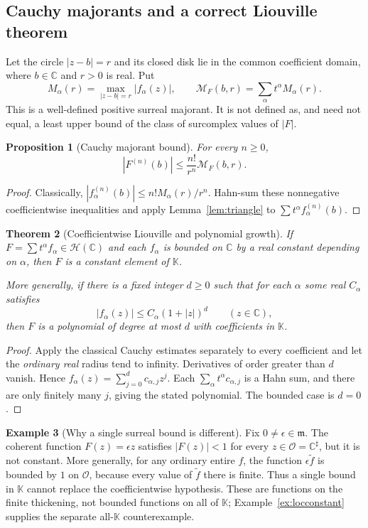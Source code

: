 \documentclass[11pt,a4paper]{article}
\numberwithin{equation}{section}
\newtheorem{theorem}{Theorem}[section]
\newtheorem{proposition}[theorem]{Proposition}
\theoremstyle{definition}
\newtheorem{example}[theorem]{Example}
\theoremstyle{remark}
\newcommand{\K}{\mathbb K}
\newcommand{\C}{\mathbb C}
\newcommand{\OO}{\mathcal O}
\newcommand{\mm}{\mathfrak m}
\newcommand{\HH}{\mathscr H}
\begin{document}
\subsection{Cauchy majorants and a correct Liouville theorem}
Let the circle $|z-b|=r$ and its closed disk lie in the common coefficient domain, where $b\in\C$ and $r>0$ is real. Put
\[
 M_\alpha(r)=\max_{|z-b|=r}|f_\alpha(z)|,
 \qquad \mathcal M_F(b,r)=\sum_\alpha t^\alpha M_\alpha(r).
\]
This is a well-defined positive surreal majorant. It is not defined as, and need not equal, a least upper bound of the class of surcomplex values of $|F|$.

\begin{proposition}[Cauchy majorant bound]
\label{prop:estimates}
For every $n\geq0$,
\[
 |F^{(n)}(b)|\leq \frac{n!}{r^n}\mathcal M_F(b,r).
\]
\end{proposition}
\begin{proof}
Classically, $|f_\alpha^{(n)}(b)|\leq n!M_\alpha(r)/r^n$. Hahn-sum these nonnegative coefficientwise inequalities and apply Lemma~\ref{lem:triangle} to $\sum t^\alpha f_\alpha^{(n)}(b)$.
\end{proof}

\begin{theorem}[Coefficientwise Liouville and polynomial growth]
\label{thm:liouville}
If $F=\sum t^\alpha f_\alpha\in\HH(\C)$ and each $f_\alpha$ is bounded on $\C$ by a real constant depending on $\alpha$, then $F$ is a constant element of $\K$.

More generally, if there is a fixed integer $d\geq0$ such that for each $\alpha$ some real $C_\alpha$ satisfies
\[
 |f_\alpha(z)|\leq C_\alpha(1+|z|)^d\qquad(z\in\C),
\]
then $F$ is a polynomial of degree at most $d$ with coefficients in $\K$.
\end{theorem}
\begin{proof}
Apply the classical Cauchy estimates separately to every coefficient and let the \emph{ordinary real} radius tend to infinity. Derivatives of order greater than $d$ vanish. Hence $f_\alpha(z)=\sum_{j=0}^d c_{\alpha,j}z^j$. Each $\sum_\alpha t^\alpha c_{\alpha,j}$ is a Hahn sum, and there are only finitely many $j$, giving the stated polynomial. The bounded case is $d=0$.
\end{proof}

\begin{example}[Why a single surreal bound is different]
Fix $0\ne\epsilon\in\mm$. The coherent function $F(z)=\epsilon z$ satisfies $|F(z)|<1$ for every $z\in\OO=\C^\sharp$, but it is not constant. More generally, for any ordinary entire $f$, the function $\epsilon\widetilde f$ is bounded by $1$ on $\OO$, because every value of $\widetilde f$ there is finite. Thus a single bound in $\K$ cannot replace the coefficientwise hypothesis. These are functions on the finite thickening, not bounded functions on all of $\K$; Example~\ref{ex:locconstant} supplies the separate all-$\K$ counterexample.
\end{example}
\end{document}
